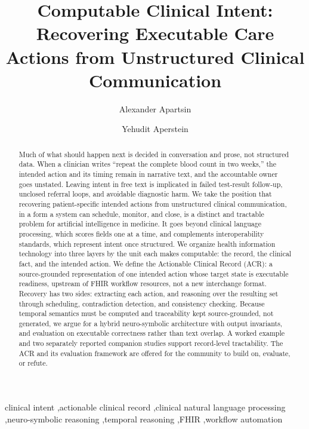 \documentclass[a4paper,fleqn]{cas-sc}
\begin{document}
\title[mode=title]{Computable Clinical Intent: Recovering Executable Care Actions from Unstructured Clinical Communication}
\author[1]{Alexander Apartsin}
\author[2]{Yehudit Aperstein}
\begin{abstract}
Much of what should happen next is decided in conversation and prose, not structured data. When a clinician writes ``repeat the complete blood count in two weeks,'' the intended action and its timing remain in narrative text, and the accountable owner goes unstated. Leaving intent in free text is implicated in failed test-result follow-up, unclosed referral loops, and avoidable diagnostic harm. We take the position that recovering patient-specific intended actions from unstructured clinical communication, in a form a system can schedule, monitor, and close, is a distinct and tractable problem for artificial intelligence in medicine. It goes beyond clinical language processing, which scores fields one at a time, and complements interoperability standards, which represent intent once structured. We organize health information technology into three layers by the unit each makes computable: the record, the clinical fact, and the intended action. We define the Actionable Clinical Record (ACR): a source-grounded representation of one intended action whose target state is executable readiness, upstream of FHIR workflow resources, not a new interchange format. Recovery has two sides: extracting each action, and reasoning over the resulting set through scheduling, contradiction detection, and consistency checking. Because temporal semantics must be computed and traceability kept source-grounded, not generated, we argue for a hybrid neuro-symbolic architecture with output invariants, and evaluation on executable correctness rather than text overlap. A worked example and two separately reported companion studies support record-level tractability. The ACR and its evaluation framework are offered for the community to build on, evaluate, or refute.
\end{abstract}
\begin{keywords}
clinical intent \sep actionable clinical record \sep clinical natural language processing \sep neuro-symbolic reasoning \sep temporal reasoning \sep FHIR \sep workflow automation
\end{keywords}
\maketitle



\FloatBarrier

\end{document}
